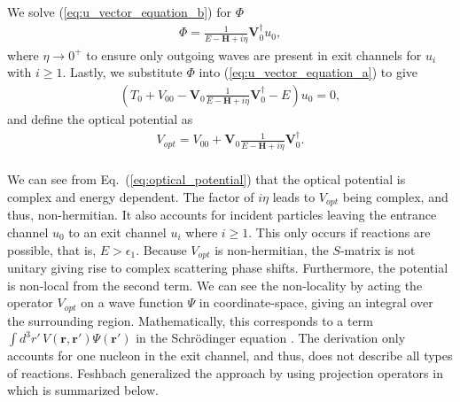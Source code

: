 \documentclass[preprintnumbers,floatfix,aps,prc,preprint,nofootinbib]{revtex4-1}
\begin{document}
%
We solve (\ref{eq:u_vector_equation_b}) for $\Phi$
%
\begin{eqnarray}
	\label{eq:phi}
	\Phi = \frac{1}{E - \textbf{H} + i \eta} \textbf{V}_0^{\dagger} u_0,
\end{eqnarray}
%
where $\eta \rightarrow 0^+$ to ensure only outgoing waves are present in exit channels for $u_i$ with $i \geq 1$. Lastly, we substitute $\Phi$ into (\ref{eq:u_vector_equation_a}) to give
%
\begin{eqnarray}
	\label{eq:u0_equation}
	(T_0 + V_{00}  - \textbf{V}_0 \frac{1}{E-\textbf{H}+i\eta} \textbf{V}_0^{\dagger} - E) u_0 = 0,
\end{eqnarray}
%
and define the optical potential as
%
\begin{eqnarray}
	\label{eq:optical_potential}
	V_{opt} = V_{00}  + \textbf{V}_0 \frac{1}{E-\textbf{H}+i\eta} \textbf{V}_0^{\dagger}.
\end{eqnarray}
%
\\

We can see from Eq.~(\ref{eq:optical_potential}) that the optical potential is complex and energy dependent. The factor of $i \eta$ leads to $V_{opt}$ being complex, and thus, non-hermitian. It also accounts for incident particles leaving the entrance channel $u_0$ to an exit channel $u_i$ where $i \geq 1$. This only occurs if reactions are possible, that is, $E > \epsilon_1$. Because $V_{opt}$ is non-hermitian, the $S$-matrix is not unitary giving rise to complex scattering phase shifts. Furthermore, the potential is non-local from the second term. We can see the non-locality by acting the operator $V_{opt}$ on a wave function $\Psi$ in coordinate-space, giving an integral over the surrounding region. Mathematically, this corresponds to a term $\int d^3 r' \, V(\textbf{r}, \textbf{r}') \Psi(\textbf{r}')$ in the Schr\"odinger equation \cite{Hodgson:1971ab}. The derivation only accounts for one nucleon in the exit channel, and thus, does not describe all types of reactions. Feshbach generalized the approach by using projection operators in \cite{Feshbach:1962ut} which is summarized below.
\\
\end{document}
